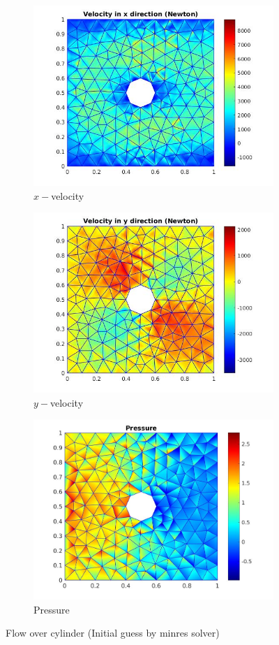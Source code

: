 \documentclass[a4paper,twoside,openright]{book}
\begin{document}
\begin{figure}
  \begin{subfigure}{\textwidth}
    \includegraphics[width=0.8\linewidth]{cylinder_newton_vx_minres.jpg}
    \caption{$x-$velocity}
  \label{x_vel_navier_stoke_minres}
  \end{subfigure}
  \begin{subfigure}{\textwidth}
    \includegraphics[width=0.8\linewidth]{cylinder_newton_vy_minres.jpg}
    \caption{$y-$velocity}
  \label{y_vel_navier_stoke_minres}
  \end{subfigure}
  \begin{subfigure}{\textwidth}
    \includegraphics[width=0.8\linewidth]{cylinder_newton_pressure_minres.jpg}
    \caption{Pressure}
  \label{pressure_navier_stoke_minres}
  \end{subfigure}
\caption{Flow over cylinder (Initial guess by minres solver)}
\label{flow_over_cylinder_minres_n_s}
\end{figure}
\end{document}
